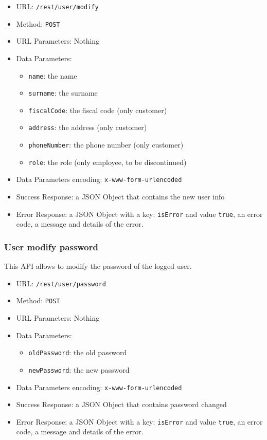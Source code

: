 \begin{itemize}
    \item URL: \texttt{/rest/user/modify}
    \item Method: \texttt{POST}
    \item URL Parameters: Nothing
    \item Data Parameters:
    \begin{itemize}
        \item \texttt{name}: the name
        \item \texttt{surname}: the surname
        \item \texttt{fiscalCode}: the fiscal code (only customer)
        \item \texttt{address}: the address (only customer)
        \item \texttt{phoneNumber}: the phone number (only customer)
        \item \texttt{role}: the role (only employee, to be discontinued)
    \end{itemize}
    \item Data Parameters encoding: \texttt{x-www-form-urlencoded}
    \item Success Response: a JSON Object that contains the new user info
    \item Error Response: a JSON Object with a key: \texttt{isError}  and value \texttt{true}, an error code, a message and details of the error.
\end{itemize}

\subsubsection*{User modify password}

This API allows to modify the password of the logged user.

\begin{itemize}
    \item URL: \texttt{/rest/user/password}
    \item Method: \texttt{POST}
    \item URL Parameters: Nothing
    \item Data Parameters:
    \begin{itemize}
        \item \texttt{oldPassword}: the old password
        \item \texttt{newPassword}: the new password
    \end{itemize}
    \item Data Parameters encoding: \texttt{x-www-form-urlencoded}
    \item Success Response: a JSON Object that contains password changed
    \item Error Response: a JSON Object with a key: \texttt{isError}  and value \texttt{true}, an error code, a message and details of the error.
\end{itemize}



